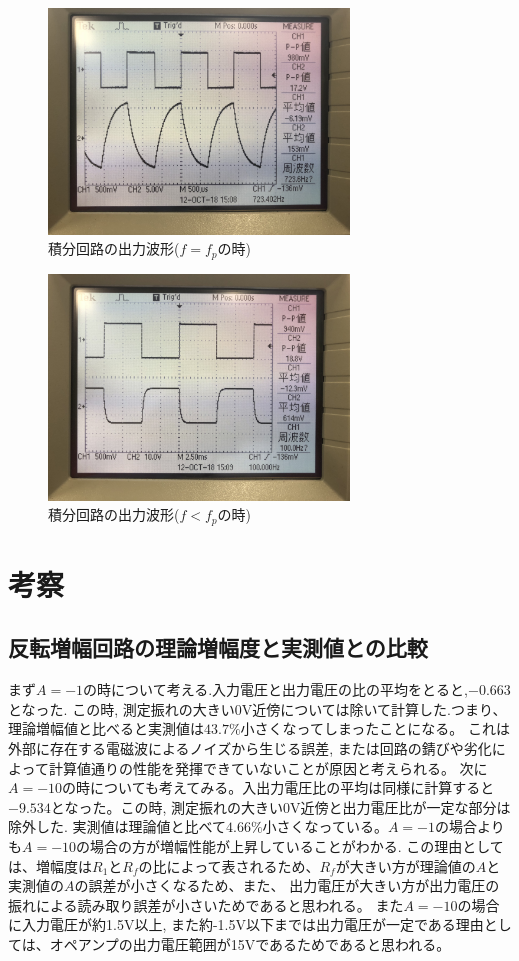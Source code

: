 \documentclass[a4paper,11pt,uplatex]{jsarticle}
\begin{document}
\begin{figure}[H]
	\begin{center}
		\includegraphics[width=8cm]{画像/f=fp.jpg}
		\caption{積分回路の出力波形($f=f_p$の時)}
	\end{center}
\end{figure}

\begin{figure}[H]
	\begin{center}
		\includegraphics[width=8cm]{画像/f<fp.jpg}
		\caption{積分回路の出力波形($f<f_p$の時)}
	\end{center}
\end{figure}


\section{考察}
\subsection{反転増幅回路の理論増幅度と実測値との比較}
まず$A = -1$の時について考える.入力電圧と出力電圧の比の平均をとると,$-0.663$となった.
この時, 測定振れの大きい0V近傍については除いて計算した.つまり、理論増幅値と比べると実測値は$43.7\%$小さくなってしまったことになる。
これは外部に存在する電磁波によるノイズから生じる誤差, または回路の錆びや劣化によって計算値通りの性能を発揮できていないことが原因と考えられる。
次に$A = -10$の時についても考えてみる。入出力電圧比の平均は同様に計算すると$-9.534$となった。この時,  測定振れの大きい0V近傍と出力電圧比が一定な部分は除外した.
実測値は理論値と比べて$4.66\%$小さくなっている。$A=-1$の場合よりも$A=-10$の場合の方が増幅性能が上昇していることがわかる.
この理由としては、増幅度は$R_1$と$R_f$の比によって表されるため、$R_f$が大きい方が理論値の$A$と実測値の$A$の誤差が小さくなるため、また、
出力電圧が大きい方が出力電圧の振れによる読み取り誤差が小さいためであると思われる。
また$A=-10$の場合に入力電圧が約1.5V以上, また約-1.5V以下までは出力電圧が一定である理由としては、オペアンプの出力電圧範囲が15Vであるためであると思われる。
\end{document}
